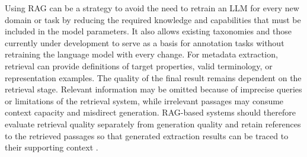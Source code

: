 Using \ac{RAG} can be a strategy to avoid the need to retrain an \ac{LLM} for every new domain or task by reducing the required knowledge and capabilities that must be included in the model parameters.
It also allows existing taxonomies and those currently under development to serve as a basis for annotation tasks without retraining the language model with every change.
For metadata extraction, retrieval can provide definitions of target properties, valid terminology, or representation examples.
The quality of the final result remains dependent on the retrieval stage.
Relevant information may be omitted because of imprecise queries or limitations of the retrieval system, while irrelevant passages may consume context capacity and misdirect generation.
RAG-based systems should therefore evaluate retrieval quality separately from generation quality and retain references to the retrieved passages so that generated extraction results can be traced to their supporting context \cite{gao2023ragsurvey,asai2024selfrag}.
